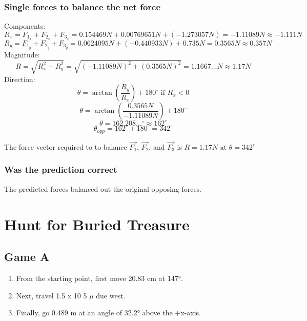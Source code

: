 \documentclass[11pt, letterpaper, includehead]{article}
\begin{document}
\subsubsection{Single forces to balance the net force} %
Components:
$$R_x = F_{1_x} + F_{2_x} + F_{3_x} = 0.154469N + 0.00769651N + (-1.273057N) = -1.11089N \approx \boxed{-1.111N} $$
$$R_y = F_{1_y} + F_{2_y} + F_{3_y} = 0.0624095N + (-0.440933N) + 0.735N = 0.3565N \approx \boxed{0.357N} $$
Magnitude:
$$R = \sqrt{R_x^2 + R_y^2} = \sqrt{(-1.11089N)^2 + (0.3565N)^2} = 1.1667...N \approx \boxed{1.17N}$$
Direction:
$$\theta = \arctan \left( \frac{R_y}{R_x} \right) + 180^{\circ} \text{ if } R_x < 0$$
$$\theta = \arctan \left( \frac{0.3565N}{-1.11089N} \right) + 180^{\circ}$$
$$\theta = 162.208\dots^{\circ} \approx {162^{\circ}}$$
$$\theta_{opp} = 162^{\circ} + 180^{\circ} = \boxed{342^{\circ}}$$

The force vector required to to balance $\vec{F_1}$, $\vec{F_2}$, and $\vec{F_3}$ is
$R = 1.17N \text{ at } \theta = 342^{\circ}$

\subsubsection{Was the prediction correct} %
The predicted forces balanced out the original opposing forces. 

\section{Hunt for Buried Treasure} %
\subsection{Game A} %
\begin{enumerate}
  \item From the starting point, first move 20.83 cm at 147°.
  \item Next, travel 1.5 x 10 5 $\mu$ due west.
  \item Finally, go 0.489 m at an angle of 32.2° above the +x-axis.
\end{enumerate}
\end{document}
